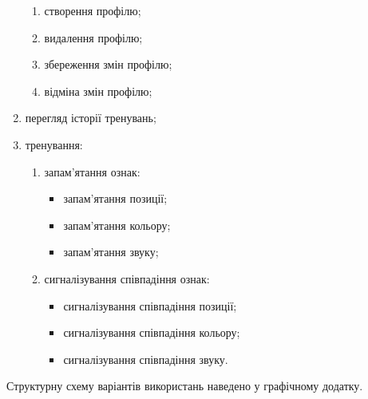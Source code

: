 \begin{enumerate}
\begin{enumerate}[leftmargin=24pt]
      \item створення профілю;
      \item видалення профілю;
      \item збереження змін профілю;
      \item відміна змін профілю;
    \end{enumerate}
  \item перегляд історії тренувань;
  \item тренування:
    \begin{enumerate}[leftmargin=24pt]
      \item запам'ятання ознак:
        \begin{itemize}
          \item запам'ятання позиції;
          \item запам'ятання кольору;
          \item запам'ятання звуку;
        \end{itemize}
      \item сигналізування співпадіння ознак:
        \begin{itemize}[leftmargin=24pt]
          \item сигналізування співпадіння позиції;
          \item сигналізування співпадіння кольору;
          \item сигналізування співпадіння звуку.
        \end{itemize}
    \end{enumerate}
\end{enumerate}

Структурну схему варіантів використань наведено у графічному додатку.

\begin{comment}
\begin{figure}[here]
  \centering\texttt{[image: ./diagrams/usecase-top.eps]}
  \caption{Діаграма прецедентів верхнього рівня}
  \label{fig:usecase-top}
\end{figure}

\begin{figure}[here]
  \centering\texttt{[image: ./diagrams/usecase-config.eps]}
  \caption{Діаграма прецедентів конфігурування}
  \label{fig:usecase-config}
\end{figure}

\begin{figure}[here]
  \centering\texttt{[image: ./diagrams/usecase-profiles.eps]}
  \caption{Діаграма прецедентів управління профілями}
  \label{fig:usecase-profiles}
\end{figure}

\begin{figure}[here]
  \centering\texttt{[image: ./diagrams/usecase-training.eps]}
  \caption{Діаграма прецедентів тренування}
  \label{fig:usecase-training}
\end{figure}
\end{comment}

